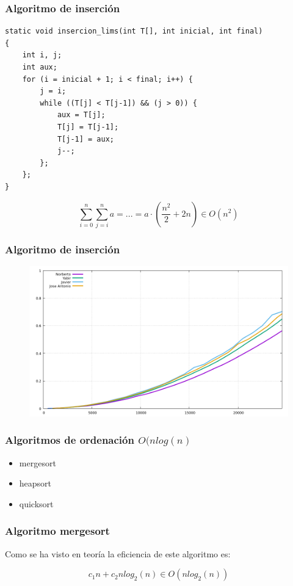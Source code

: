 \documentclass[spanish]{beamer}
\begin{document}
  \begin{frame}[fragile]\frametitle{Algoritmo de inserción}

\begin{lstlisting}
static void insercion_lims(int T[], int inicial, int final)
{
	int i, j;
	int aux;
	for (i = inicial + 1; i < final; i++) {
		j = i;
		while ((T[j] < T[j-1]) && (j > 0)) {
			aux = T[j];
			T[j] = T[j-1];
			T[j-1] = aux;
			j--;
		};
	};
}
\end{lstlisting}

\end{frame}

\begin{frame}
  $$\sum_{i=0}^{n} \sum_{j=i}^{n} a = ... = a \cdot (\frac{n^2}{2} + 2n) \in O(n^2)$$
\end{frame}


\begin{frame}\frametitle{Algoritmo de inserción}
  \begin{figure}[H]
    \centering   
        \includegraphics[clip,width=1\columnwidth]{../plots/insercion}%
    \end{figure}
  \end{frame}

  \begin{frame}\frametitle{Algoritmos de ordenación $O(nlog(n)$}

    \begin{itemize}
    \item mergesort
    \item heapsort
    \item quicksort
    \end{itemize}
    
\end{frame}

\begin{frame}\frametitle{Algoritmo mergesort}

  Como se ha visto en teoría la eficiencia de este algoritmo es:

  $$c_1n + c_2nlog_2(n) \in O(nlog_2(n))$$
  
\end{frame}
\end{document}
